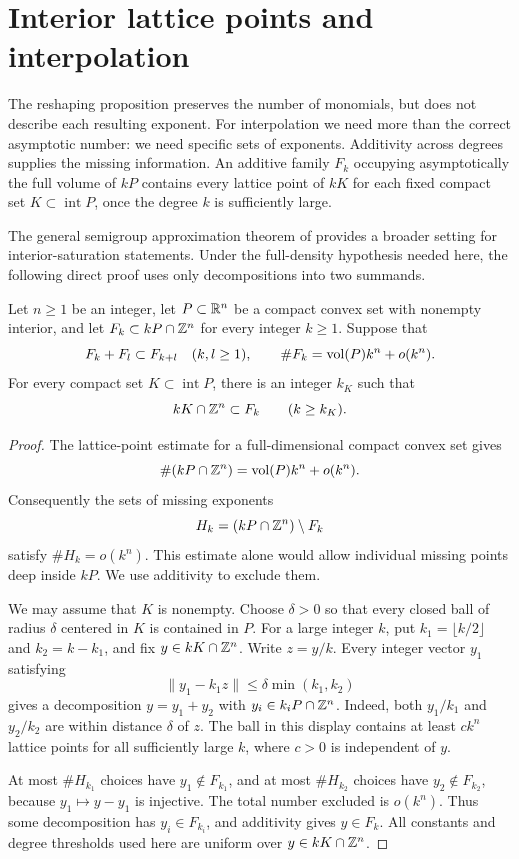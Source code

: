 \section{Interior lattice points and interpolation}
\label{sec:saturation}

The reshaping proposition preserves the number of monomials, but does not
describe each resulting exponent. For interpolation we need more than the
correct asymptotic number: we need specific sets of exponents. Additivity
across degrees supplies the missing information. An additive family $F_k$
occupying asymptotically the full volume of $kP$ contains every lattice point
of $kK$ for each fixed compact set $K\subset\operatorname{int}P$, once the
degree $k$ is sufficiently large.

The general semigroup approximation theorem of
\citet[Theorem~1.6]{KavehKhovanskii2012} provides a broader setting for
interior-saturation statements. Under the full-density hypothesis needed
here, the following direct proof uses only decompositions into two summands.

\begin{lemma}
\label{lem:interior-saturation}
Let $n\ge1$ be an integer, let $P\subset\mathbb R^n$ be a compact convex set with
nonempty interior, and let $F_k\subset kP\cap\mathbb Z^n$ for every integer
$k\ge1$. Suppose that
\[
 F_k+F_l\subset F_{k+l}\quad(k,l\ge1),
 \qquad
 \#F_k=\operatorname{vol}(P)k^n+o(k^n).
\]
For every compact set $K\subset\operatorname{int}P$, there is an integer
$k_K$ such that
\[
 kK\cap\mathbb Z^n\subset F_k\qquad(k\ge k_K).
\]
\end{lemma}

\begin{proof}
The lattice-point estimate for a full-dimensional compact convex set gives
\[
 \#(kP\cap\mathbb Z^n)=\operatorname{vol}(P)k^n+o(k^n).
\]
Consequently the sets of missing exponents
\[
 H_k=(kP\cap\mathbb Z^n)\setminus F_k
\]
satisfy $\#H_k=o(k^n)$. This estimate alone would allow individual missing
points deep inside $kP$. We use additivity to exclude them.

We may assume that $K$ is nonempty. Choose $\delta>0$ so that every closed
ball of radius $\delta$ centered in $K$ is contained in $P$. For a large
integer $k$, put $k_1=\lfloor k/2\rfloor$ and $k_2=k-k_1$, and fix
$y\in kK\cap\mathbb Z^n$. Write $z=y/k$. Every integer vector $y_1$ satisfying
\[
 \lVert y_1-k_1z\rVert\le\delta\min(k_1,k_2)
\]
gives a decomposition $y=y_1+y_2$ with $y_i\in k_iP\cap\mathbb Z^n$. Indeed,
both $y_1/k_1$ and $y_2/k_2$ are within distance $\delta$ of $z$.
The ball in this display contains at least $c k^n$ lattice points for all
sufficiently large $k$, where $c>0$ is independent of $y$.

At most $\#H_{k_1}$ choices have $y_1\notin F_{k_1}$, and at most
$\#H_{k_2}$ choices have $y_2\notin F_{k_2}$, because $y_1\mapsto y-y_1$
is injective. The total number excluded is $o(k^n)$. Thus some decomposition
has $y_i\in F_{k_i}$, and additivity gives $y\in F_k$. All constants and
degree thresholds used here are uniform over $y\in kK\cap\mathbb Z^n$.
\end{proof}


